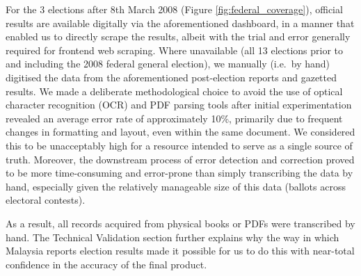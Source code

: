 \documentclass[11pt]{article}
\begin{document}
\begin{figure}[htbp]
\end{figure}

For the 3 elections after 8th March 2008 (Figure \ref{fig:federal_coverage}), official results are available digitally via the aforementioned dashboard, in a manner that enabled us to directly scrape the results, albeit with the trial and error generally required for frontend web scraping. Where unavailable (all 13 elections prior to and including the 2008 federal general election), we manually (i.e.\ by hand) digitised the data from the aforementioned post-election reports and gazetted results. We made a deliberate methodological choice to avoid the use of optical character recognition (OCR) and PDF parsing tools after initial experimentation revealed an average error rate of approximately 10\%, primarily due to frequent changes in formatting and layout, even within the same document. We considered this to be unacceptably high for a resource intended to serve as a single source of truth. Moreover, the downstream process of error detection and correction proved to be more time-consuming and error-prone than simply transcribing the data by hand, especially given the relatively manageable size of this data (\TOTALBALLOTS\space ballots across \TOTALCONTESTS\space electoral contests). 

As a result, all records acquired from physical books or PDFs were transcribed by hand. The Technical Validation section further explains why the way in which Malaysia reports election results made it possible for us to do this with near-total confidence in the accuracy of the final product.
\end{document}
